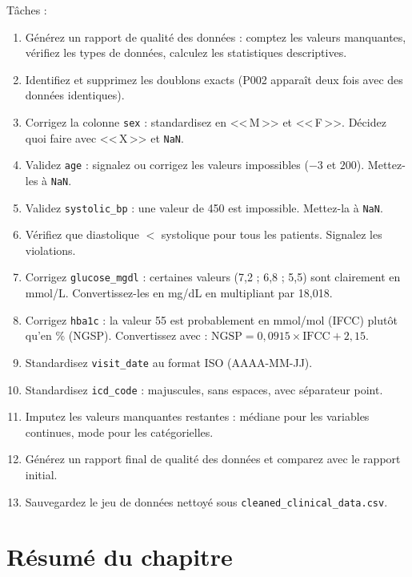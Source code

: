 \begin{exercise}
T\^aches :
\begin{enumerate}
  \item G\'en\'erez un rapport de qualit\'e des donn\'ees : comptez les valeurs manquantes, v\'erifiez les types de donn\'ees, calculez les statistiques descriptives.
  \item Identifiez et supprimez les doublons exacts (P002 appara\^it deux fois avec des donn\'ees identiques).
  \item Corrigez la colonne \texttt{sex} : standardisez en <<\,M\,>> et <<\,F\,>>. D\'ecidez quoi faire avec <<\,X\,>> et \texttt{NaN}.
  \item Validez \texttt{age} : signalez ou corrigez les valeurs impossibles ($-3$ et $200$). Mettez-les \`a \texttt{NaN}.
  \item Validez \texttt{systolic\_bp} : une valeur de 450 est impossible. Mettez-la \`a \texttt{NaN}.
  \item V\'erifiez que diastolique $<$ systolique pour tous les patients. Signalez les violations.
  \item Corrigez \texttt{glucose\_mgdl} : certaines valeurs (7,2 ; 6,8 ; 5,5) sont clairement en mmol/L. Convertissez-les en mg/dL en multipliant par 18,018.
  \item Corrigez \texttt{hba1c} : la valeur 55 est probablement en mmol/mol (IFCC) plut\^ot qu'en \% (NGSP). Convertissez avec : $\text{NGSP} = 0{,}0915 \times \text{IFCC} + 2{,}15$.
  \item Standardisez \texttt{visit\_date} au format ISO (AAAA-MM-JJ).
  \item Standardisez \texttt{icd\_code} : majuscules, sans espaces, avec s\'eparateur point.
  \item Imputez les valeurs manquantes restantes : m\'ediane pour les variables continues, mode pour les cat\'egorielles.
  \item G\'en\'erez un rapport final de qualit\'e des donn\'ees et comparez avec le rapport initial.
  \item Sauvegardez le jeu de donn\'ees nettoy\'e sous \texttt{cleaned\_clinical\_data.csv}.
\end{enumerate}
\end{exercise}

\section{R\'esum\'e du chapitre}

